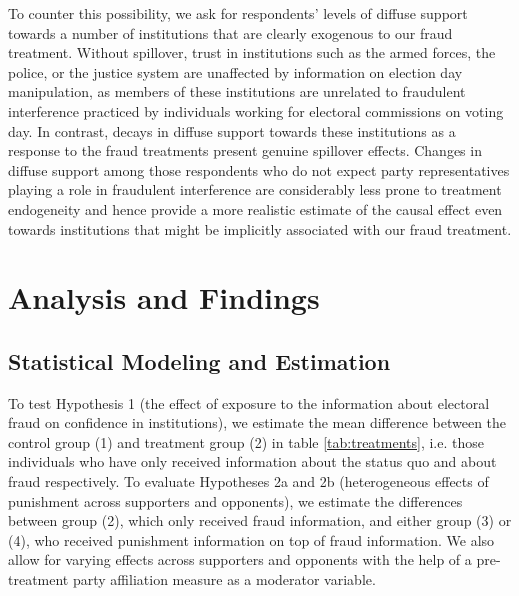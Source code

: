 \documentclass[11pt, ngerman,english,a4]{article}
\begin{document}
To counter this possibility, 
we ask for respondents' levels of diffuse support towards a number of institutions that are clearly exogenous to our fraud treatment. 
Without spillover, trust in institutions such as the armed forces, the police, or the justice system are unaffected by information on election day manipulation, as members of these institutions are unrelated to fraudulent interference practiced by individuals working for electoral commissions on voting day. 
In contrast, decays in diffuse support towards these institutions as a response to the fraud treatments present genuine spillover effects. 
Changes in diffuse support among those respondents who do not expect party representatives playing a role in fraudulent interference are considerably less prone to treatment endogeneity and hence provide a more realistic estimate of the causal effect even towards institutions that might be implicitly associated with our fraud treatment. 

\newpage
\section*{Analysis and Findings}

\subsection*{Statistical Modeling and Estimation}

To test Hypothesis 1 (the effect of exposure to the information about electoral fraud on confidence in institutions), we estimate the mean difference between the control group (1) and treatment group (2) in table \ref{tab:treatments}, i.e. those individuals who have only received information about the status quo and about fraud respectively.
To evaluate Hypotheses 2a and 2b (heterogeneous effects of punishment across supporters and opponents), we estimate the differences between group (2), which only received fraud information, and either group (3) or (4), who received punishment information on top of fraud information. We also allow for varying effects across supporters and opponents with the help of a pre-treatment party affiliation measure as a moderator variable. 
\end{document}
